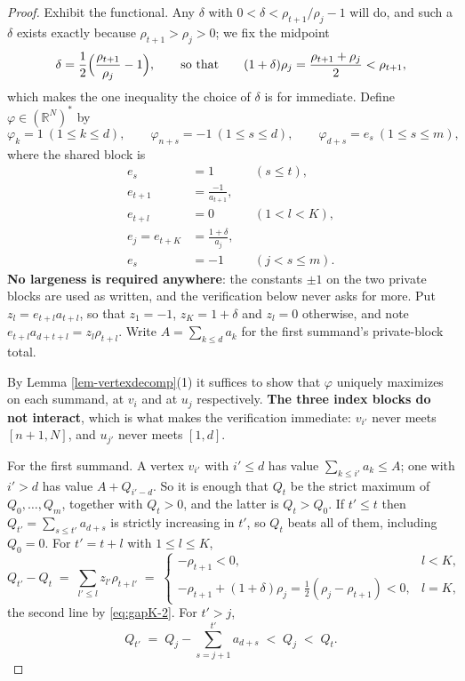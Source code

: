 \documentclass[11pt, a4paper, abstract=yes]{scrartcl}
\theoremstyle{definition}
\theoremstyle{remark}
\theoremstyle{plain}
\begin{document}
\begin{proof}
Exhibit the functional. Any \(\delta\) with \(0<\delta<\rho_{t+1}/\rho_j-1\) will do, and such a
\(\delta\) exists exactly because \(\rho_{t+1}>\rho_j>0\); we fix the midpoint
\begin{equation}\label{eq:gapK-2}
  \delta=\frac12\Bigl(\frac{\rho_{t+1}}{\rho_j}-1\Bigr),
  \qquad\text{so that}\qquad (1+\delta)\rho_j=\frac{\rho_{t+1}+\rho_j}{2}<\rho_{t+1},
\end{equation}
which makes the one inequality the choice of \(\delta\) is for immediate. Define
\(\varphi\in(\mathbb R^N)^*\) by
\begin{equation}\label{eq:gapK-3}
  \varphi_k=1\ (1\le k\le d),\qquad \varphi_{n+s}=-1\ (1\le s\le d),\qquad
  \varphi_{d+s}=e_s\ (1\le s\le m),
\end{equation}
where the shared block is
\begin{align}
  e_s &= 1 & &(s\le t), \label{eq:gapK-e1}\\
  e_{t+1} &= \frac{-1}{a_{t+1}}, & & \label{eq:gapK-e2}\\
  e_{t+l} &= 0 & &(1<l<K), \label{eq:gapK-e3}\\
  e_{j}=e_{t+K} &= \frac{1+\delta}{a_{j}}, & & \label{eq:gapK-e4}\\
  e_s &= -1 & &(j<s\le m). \label{eq:gapK-e5}
\end{align}
\textbf{No largeness is required anywhere}: the constants \(\pm1\) on the two private blocks are used as
written, and the verification below never asks for more. Put \(z_l=e_{t+l}a_{t+l}\), so that
\(z_1=-1\), \(z_K=1+\delta\) and \(z_l=0\) otherwise, and note \(e_{t+l}a_{d+t+l}=z_l\rho_{t+l}\).
Write \(A=\sum_{k\le d}a_k\) for the first summand's private-block total.

By Lemma \ref{lem-vertexdecomp}(1) it suffices to show that \(\varphi\) uniquely maximizes on each summand,
at \(v_i\) and at \(u_j\) respectively. \textbf{The three index blocks do not interact}, which is what
makes the verification immediate: \(v_{i'}\) never meets \([n+1,N]\), and \(u_{j'}\) never meets
\([1,d]\).

For the first summand. A vertex \(v_{i'}\) with \(i'\le d\) has value \(\sum_{k\le i'}a_k\le A\); one
with \(i'>d\) has value \(A+Q_{i'-d}\). So it is enough that \(Q_t\) be the strict maximum of
\(Q_0,\dots,Q_m\), together with \(Q_t>0\), and the latter is \(Q_t>Q_0\). If \(t'\le t\) then
\(Q_{t'}=\sum_{s\le t'}a_{d+s}\) is strictly increasing in \(t'\), so \(Q_t\) beats all of them,
including \(Q_0=0\). For \(t'=t+l\) with \(1\le l\le K\),
\begin{equation}\label{eq:gapK-Qstep}
  Q_{t'}-Q_t\;=\;\sum_{l'\le l}z_{l'}\rho_{t+l'}
  \;=\;\begin{cases}
    -\rho_{t+1}<0, & l<K,\\[2pt]
    -\rho_{t+1}+(1+\delta)\rho_j=\tfrac12(\rho_j-\rho_{t+1})<0, & l=K,
  \end{cases}
\end{equation}
the second line by \eqref{eq:gapK-2}. For \(t'>j\),
\begin{equation}\label{eq:gapK-Qtail}
  Q_{t'}\;=\;Q_j-\sum_{s=j+1}^{t'}a_{d+s}\;<\;Q_j\;<\;Q_t .
\end{equation}


\end{proof}
\end{document}
